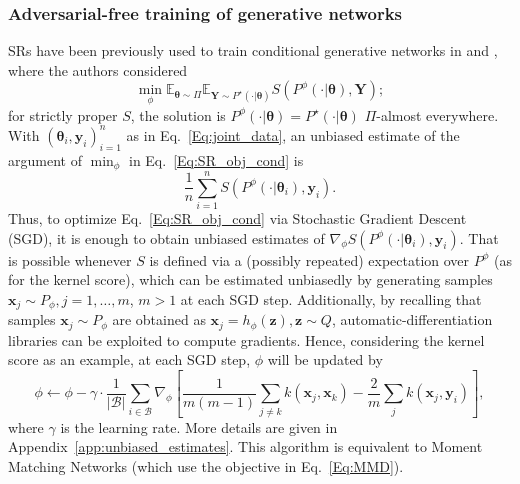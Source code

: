 \documentclass[twoside,11pt]{article}
\newcommand{\E}{\mathbb{E}}
\newcommand{\ddz}{\mathbf{z}}
\newcommand{\ddtheta}{\boldsymbol{\theta}}
\newcommand{\ddsim}{\mathbf{x}}
\newcommand{\ddobs}{\mathbf{y}}
\newcommand{\Ddobs}{\mathbf{Y}}
\begin{document}
	\subsubsection{Adversarial-free training of generative networks}\label{sec:adv_free_training}
	
	SRs have been previously used to train conditional generative networks in \cite{bouchacourt2016disco} and \cite{gritsenko2020spectral}, where the authors considered
	\begin{equation}\label{Eq:SR_obj_cond}
	\min_\phi \E_{\ddtheta\sim\Pi} \E_{\Ddobs\sim P^\star(\cdot|\ddtheta)} S(P^\phi(\cdot|\ddtheta),\Ddobs);
	\end{equation}
	for strictly proper $ S $, the solution is $ P^\phi(\cdot|\ddtheta) =P^\star(\cdot|\ddtheta) $ $ \Pi $-almost everywhere. With $ (\ddtheta_i, \ddobs_i)_{i=1}^n $ as in Eq.~\eqref{Eq:joint_data}, an unbiased estimate of the argument of $ \min_\phi $ in Eq.~\eqref{Eq:SR_obj_cond} is
	\begin{equation}\label{Eq:SR_obj_cond_emp}
	\frac{1}{n} \sum_{i=1}^n S(P^\phi(\cdot|\ddtheta_i),\ddobs_i).
	\end{equation}
	Thus, to optimize Eq.~\eqref{Eq:SR_obj_cond} via Stochastic Gradient Descent (SGD), it is enough to obtain unbiased estimates of $\nabla_\phi S(P^\phi(\cdot|\ddtheta_i),\ddobs_i) $. That is possible whenever $ S $ is defined via a (possibly repeated) expectation over $ P^\phi $ (as for the kernel score), which can be estimated unbiasedly by generating samples $\ddsim_j\sim P_\phi, j=1,\ldots,m $, $ m>1 $ at each SGD step. Additionally, by recalling that samples $ \ddsim_j\sim P_\phi $ are obtained as $ \ddsim_j = h_\phi(\ddz), \ddz\sim Q $, automatic-differentiation libraries \citep{pytorch} can be exploited to compute gradients. 
	Hence, considering the kernel score as an example, at each SGD step, $ \phi $ will be updated by
	\begin{equation}\label{Eq:grad_update_k}
	\phi \leftarrow \phi - \gamma \cdot \frac{1}{|\mathcal B|} \sum_{i \in \mathcal{B}} \nabla_\phi  \left[\frac{1}{m(m-1)} \sum_{j\neq k} k(\ddsim_j, \ddsim_k) -  \frac{2}{m} \sum_{j} k(\ddsim_j, \ddobs_i)   \right],
	\end{equation}
	where $ \gamma  $ is the learning rate. More details are given in Appendix~\ref{app:unbiased_estimates}.
	This algorithm is equivalent to Moment Matching Networks (which use the objective in Eq.~\ref{Eq:MMD}).
	
\end{document}
